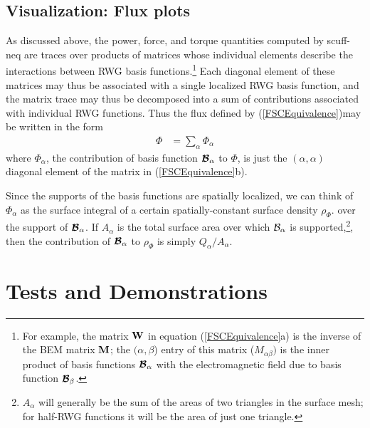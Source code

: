 \documentclass[letterpaper]{article}
\begin{document}
\subsection{Visualization: Flux plots}

As discussed above, the power, force, and torque quantities
computed by {\sc scuff-neq} are traces over products of matrices
whose individual elements describe the interactions between
RWG basis functions.\footnote{For example, the matrix $\mathbf{W}$ 
in equation (\ref{FSCEquivalence}a) is the inverse of the BEM matrix 
$\mathbf{M}$; the $(\alpha,\beta$) entry of this matrix 
($M_{\alpha\beta})$ is the inner product of basis functions 
$\boldsymbol{\mathcal{B}}_\alpha$ with the electromagnetic field due to basis
function $\boldsymbol{\mathcal{B}}_\beta$.} Each diagonal element of these
matrices may thus be associated with a single localized
RWG basis function, and the matrix trace may thus be
decomposed into a sum of contributions associated with 
individual RWG functions. Thus the flux defined
by (\ref{FSCEquivalence})may be written in the form 
\begin{align*}
 \Phi &= \sum_{\alpha} \Phi_{\alpha}
\end{align*}
where $\Phi_{\alpha}$, the contribution of basis function
$\boldsymbol{\mathcal{B}}_\alpha$ to $\Phi$, is just the $(\alpha,\alpha)$ 
diagonal element of the matrix in (\ref{FSCEquivalence}b).

Since the supports of the basis functions are spatially localized,
we can think of $\Phi_\alpha$ as the surface integral
of a certain spatially-constant surface density $\rho_\Phi.$
over the support of $\boldsymbol{\mathcal{B}}_\alpha$.
If $A_\alpha$ is the total surface area over which
$\mathcal{B}_\alpha$ is supported,\footnote{$A_\alpha$ will generally be
the sum of the areas of two triangles in the surface mesh;
for half-RWG functions it will be the area of just one
triangle.}, then the contribution of $\boldsymbol{\mathcal{B}}_\alpha$
to $\rho_\Phi$ is simply $Q_\alpha / A_\alpha$.

\newpage
\section{Tests and Demonstrations}
\end{document}
